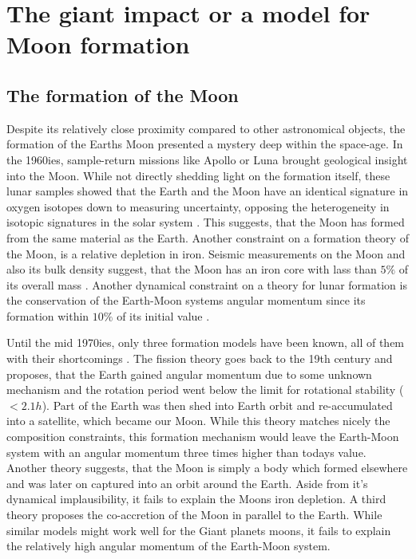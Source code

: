 \chapter{The giant impact or a model for Moon formation}
\label{ch05}
\graphicspath{{./05figs/}}

\section{The formation of the Moon}
Despite its relatively close proximity compared to other astronomical objects, the formation of the Earths Moon presented a mystery deep within the space-age. In the 1960ies, sample-return missions like Apollo or Luna brought geological insight into the Moon. While not directly shedding light on the formation itself, these lunar samples showed that the Earth and the Moon have an identical signature in oxygen isotopes down to measuring uncertainty, opposing the heterogeneity in isotopic signatures in the solar system \citep{Wiechert:2001p3543}. This suggests, that the Moon has formed from the same material as the Earth. Another constraint on a formation theory of the Moon, is a relative depletion in iron. Seismic measurements on the Moon and also its bulk density suggest, that the Moon has an iron core with lass than $5 \%$ of its overall mass \citep{2011Sci...331..309W}. Another dynamical constraint on a theory for lunar formation is the conservation of the Earth-Moon systems angular momentum since its formation within $10\%$ of its initial value \citep{Canup:2001p3295}. 

Until the mid 1970ies, only three formation models have been known, all of them with their shortcomings \citep{Stevenson:1987p3540}. The fission theory goes back to the 19th century and proposes, that the Earth gained angular momentum due to some unknown mechanism and the rotation period went below the limit for rotational stability ($< 2.1h$). Part of the Earth was then shed into Earth orbit and re-accumulated into a satellite, which became our Moon. While this theory matches nicely the composition constraints, this formation mechanism would leave the Earth-Moon system with an angular momentum three times higher than todays value. Another theory suggests, that the Moon is simply a body which formed elsewhere and was later on captured into an orbit around the Earth. Aside from it's dynamical implausibility, it fails to explain the Moons iron depletion. A third theory proposes the co-accretion of the Moon in parallel to the Earth. While similar models might work well for the Giant planets moons, it fails to explain the relatively high angular momentum of the Earth-Moon system.

